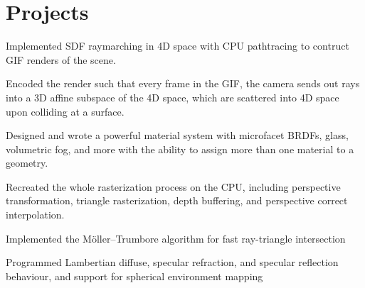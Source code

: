 \section{Projects}

\begin{resumeItem}
\begin{resumeList}
    \item Implemented SDF raymarching in 4D space with CPU pathtracing to contruct GIF renders of the scene.
    \item Encoded the render such that every frame in the GIF, the camera sends out rays into a 3D affine subspace of the 4D space, which are scattered into 4D space upon colliding at a surface.
    \item Designed and wrote a powerful material system with microfacet BRDFs, glass, volumetric fog, and more with the ability to assign more than one material to a geometry.
\end{resumeList}
\end{resumeItem}



\begin{resumeItem}
\begin{resumeList}
    \item Recreated the whole rasterization process on the CPU, including perspective transformation, triangle rasterization, depth buffering, and perspective correct interpolation.
\end{resumeList}
\end{resumeItem}

\begin{resumeItem}
\begin{resumeList}
    \item Implemented the Möller–Trumbore algorithm for fast ray-triangle intersection
    \item Programmed Lambertian diffuse, specular refraction, and specular reflection behaviour, and support for spherical environment mapping
\end{resumeList}
\end{resumeItem}

